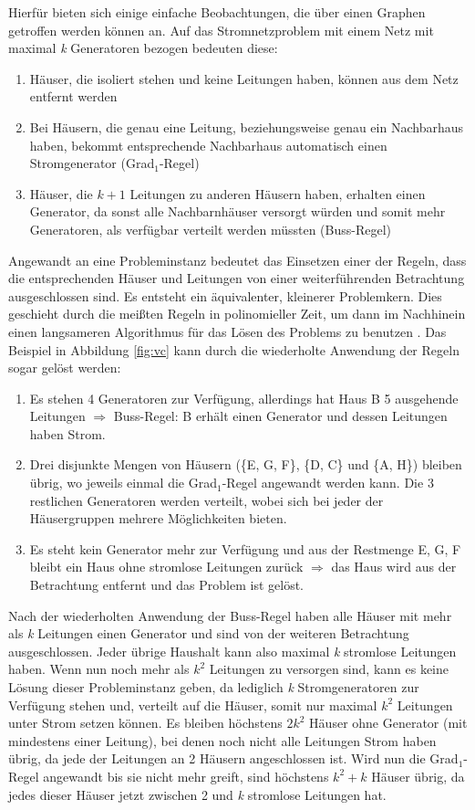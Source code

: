 Hierfür bieten sich einige einfache Beobachtungen, die über einen Graphen getroffen werden können an. Auf das Stromnetzproblem mit einem Netz mit maximal \emph{k} Generatoren bezogen bedeuten diese: 
\begin{enumerate}
\item Häuser, die isoliert stehen und keine Leitungen haben, können aus dem Netz entfernt werden
\item Bei Häusern, die genau eine Leitung, beziehungsweise genau ein Nachbarhaus haben, bekommt entsprechende Nachbarhaus automatisch einen Stromgenerator (Grad$_{1}$-Regel)
\item Häuser, die $k+1$ Leitungen zu anderen Häusern haben, erhalten einen Generator, da sonst alle Nachbarnhäuser versorgt würden und somit mehr Generatoren, als verfügbar verteilt werden müssten (Buss-Regel)
\end{enumerate}
Angewandt an eine Probleminstanz bedeutet das Einsetzen einer der Regeln, dass die entsprechenden Häuser und Leitungen von einer weiterführenden Betrachtung ausgeschlossen sind. Es entsteht ein äquivalenter, kleinerer Problemkern. Dies geschieht durch die meißten Regeln in polinomieller Zeit, um dann im Nachhinein einen langsameren Algorithmus für das Lösen des Problems zu benutzen \cite{param}. Das Beispiel in Abbildung \ref{fig:vc} kann durch die wiederholte Anwendung der Regeln sogar gelöst werden:
\begin{enumerate}
\item Es stehen 4 Generatoren zur Verfügung, allerdings hat Haus B 5 ausgehende Leitungen $\Rightarrow$ Buss-Regel: B erhält einen Generator und dessen Leitungen haben Strom.
\item Drei disjunkte Mengen von Häusern (\{E, G, F\}, \{D, C\} und \{A, H\}) bleiben übrig, wo jeweils einmal die Grad$_{1}$-Regel angewandt werden kann. Die 3 restlichen Generatoren werden verteilt, wobei sich bei jeder der Häusergruppen mehrere Möglichkeiten bieten.
\item Es steht kein Generator mehr zur Verfügung und aus der Restmenge {E, G, F} bleibt ein Haus ohne stromlose Leitungen zurück $\Rightarrow$ das Haus wird aus der Betrachtung entfernt und das Problem ist gelöst.
\end{enumerate}
Nach der wiederholten Anwendung der Buss-Regel haben alle Häuser mit mehr als \emph{k} Leitungen einen Generator und sind von der weiteren Betrachtung ausgeschlossen. Jeder übrige Haushalt kann also maximal \emph{k} stromlose Leitungen haben. Wenn nun noch mehr als $k^{2}$ Leitungen zu versorgen sind, kann es keine Lösung dieser Probleminstanz geben, da lediglich \emph{k} Stromgeneratoren zur Verfügung stehen und, verteilt auf die Häuser, somit nur maximal $k^{2}$ Leitungen unter Strom setzen können. Es bleiben höchstens $2 k^{2}$ Häuser ohne Generator (mit mindestens einer Leitung), bei denen noch nicht alle Leitungen Strom haben übrig\cite{param}, da jede der Leitungen an 2 Häusern angeschlossen ist. Wird nun die Grad$_{1}$-Regel angewandt bis sie nicht mehr greift, sind höchstens $k^{2} + k$ Häuser übrig, da jedes dieser Häuser jetzt zwischen 2 und \emph{k} stromlose Leitungen hat.


